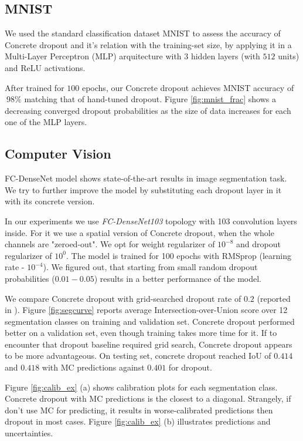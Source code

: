 \documentclass{article}
\begin{document}
\subsection{MNIST}
We used the standard classification dataset MNIST \cite{lecun-mnisthandwrittendigit-2010} to assess the accuracy of Concrete dropout and it's relation with the training-set size, by applying it in a Multi-Layer Perceptron (MLP) arquitecture with $3$ hidden layers (with $512$ units) and ReLU activations.

After trained for $100$ epochs, our Concrete dropout achieves MNIST accuracy of $~98\%$  matching that of hand-tuned dropout. Figure \ref{fig:mnist_frac} shows a decreasing converged dropout probabilities as the size of data increases for each one of the MLP layers. 

\subsection{Computer Vision}

FC-DenseNet model \cite{densenet} shows state-of-the-art results in image segmentation task. We try to further improve the model by substituting each dropout layer in it with its concrete version.

In our experiments we use \textit{FC-DenseNet103} topology with 103 convolution layers inside. For it we use a spatial version of Concrete dropout, when the whole channels are "zeroed-out". We opt for weight regularizer of $10^{-8}$ and dropout regularizer of $10^0$. The model is trained for 100 epochs with RMSprop (learning rate - $10^{-4}$). We figured out, that starting from small random dropout probabilities ($0.01-0.05$) results in a better performance of the model.

We compare Concrete dropout with grid-searched dropout rate of $0.2$ (reported in \cite{densenet}). Figure \ref{fig:segcurve} reports average Intersection-over-Union score over 12 segmentation classes on training and validation set. Concrete dropout performed better on a validation set, even though training takes more time for it. If to encounter that dropout baseline required grid search, Concrete dropout appears to be more advantageous. On testing set, concrete dropout reached IoU of $0.414$ and $0.418$ with MC predictions against $0.401$ for dropout.

Figure \ref{fig:calib_ex} (a) shows calibration plots for each segmentation class. Concrete dropout with MC predictions is the closest to a diagonal. Strangely, if don't use MC for predicting, it results in worse-calibrated predictions then dropout in most cases. Figure \ref{fig:calib_ex} (b) illustrates predictions and uncertainties.
\end{document}
